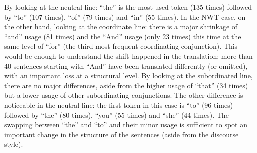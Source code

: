 \documentclass[sigchi]{article}
\begin{document}
By looking at the neutral line: “the” is the most used token  (135 times) followed by “to” (107 times), “of” (79 times) and “in” (55 times). 
In the NWT case, on the other hand, looking at the coordinate line: there is a major shrinkage of “and” usage (81 times) and the “And” usage (only 23 times) this time at the same level of “for” (the third most frequent coordinating conjunction). This would be enough to understand the shift happened in the translation: more than 40 sentences starting with “And” have been translated differently (or omitted), with an important loss at a structural level. By looking at the subordinated line, there are no major differences, aside from the higher usage of “that” (34 times) but a lower usage of other subordinating conjunctions. The other difference is noticeable in the neutral line: the first token in this case is “to” (96 times) followed by “the” (80 times), “you” (55 times) and “she” (44 times).  The swapping between “the” and “to” and their minor usage is sufficient to spot an important change in the structure of the sentences (aside from the discourse style).
\end{document}
